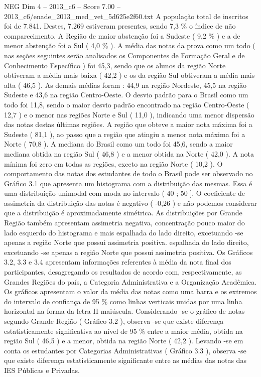 \begin{textsample}{NEG Dim 4 – 2013\_c6 – Score 7.00 – 2013\_c6/enade\_2013\_med\_vet\_5d625e2f60.txt}
A população total de inscritos foi de 7.841.
Destes, 7.269 estiveram presentes, sendo 7,3 \% o índice de não comparecimento.
A Região de maior abstenção foi a Sudeste ( 9,2 \% ) e a de menor abstenção foi a Sul ( 4,0 \% ).
A média das notas da prova como um todo ( nas seções seguintes serão analisados os Componentes de Formação Geral e de Conhecimento Específico ) foi 45,3, sendo que os alunos da região Norte obtiveram a média mais baixa ( 42,2 ) e os da região Sul obtiveram a média mais alta ( 46,5 ).
As demais médias foram : 44,9 na região Nordeste, 45,5 na região Sudeste e 43,6 na região Centro-Oeste.
O desvio padrão para o Brasil como um todo foi 11,8, sendo o maior desvio padrão encontrado na região Centro-Oeste ( 12,7 ) e o menor nas regiões Norte e Sul ( 11,0 ), indicando uma menor dispersão das notas destas últimas regiões.
A região que obteve a maior nota máxima foi a Sudeste ( 81,1 ), ao passo que a região que atingiu a menor nota máxima foi a Norte ( 70,8 ).
A mediana do Brasil como um todo foi 45,6, sendo a maior mediana obtida na região Sul ( 46,8 ) e a menor obtida na Norte ( 42,0 ).
A nota mínima foi zero em todas as regiões, exceto na região Norte ( 10,2 ).
O comportamento das notas dos estudantes de todo o Brasil pode ser observado no Gráfico 3.1 que apresenta um histograma com a distribuição das mesmas.
Essa é uma distribuição unimodal com moda no intervalo ( 40 ; 50 ].
O coeficiente de assimetria da distribuição das notas é negativo ( -0,26 ) e não podemos considerar que a distribuição é aproximadamente simétrica.
As distribuições por Grande Região também apresentam assimetria negativa, concentração pouco maior do lado esquerdo do histograma e mais espalhada do lado direito, excetuando -se apenas a região Norte que possui assimetria positiva. espalhada do lado direito, excetuando -se apenas a região Norte que possui assimetria positiva.
Os Gráficos 3.2, 3.3 e 3.4 apresentam informações referentes à média da nota final dos participantes, desagregando os resultados de acordo com, respectivamente, as Grandes Regiões do país, a Categoria Administrativa e a Organização Acadêmica.
Os gráficos apresentam o valor da média das notas como uma barra e os extremos do intervalo de confiança de 95 \% como linhas verticais unidas por uma linha horizontal na forma da letra H maiúscula.
Considerando -se o gráfico de notas segundo Grande Região ( Gráfico 3.2 ), observa -se que existe diferença estatisticamente significativa ao nível de 95 \% entre a maior média, obtida na região Sul ( 46,5 ) e a menor, obtida na região Norte ( 42,2 ).
Levando -se em conta os estudantes por Categorias Administrativas ( Gráfico 3.3 ), observa -se que existe diferença estatisticamente significante entre as médias das notas das IES Públicas e Privadas.

\end{textsample}
